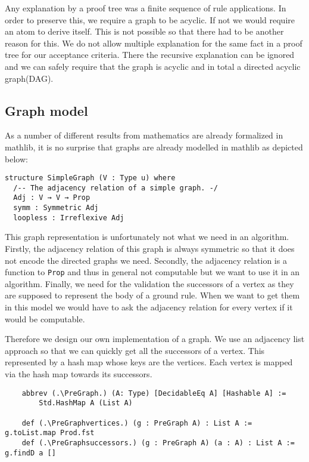 Any explanation by a proof tree was a finite sequence of rule applications. In order to preserve this, we require a graph to be acyclic. If not we would require an atom to derive itself. This is not possible so that there had to be another reason for this. We do not allow multiple explanation for the same fact in a proof tree for our acceptance criteria. There the recursive explanation can be ignored and we can safely require that the graph is acyclic and in total a directed acyclic graph(DAG).

\subsection{Graph model}

As a number of different results from mathematics are already formalized in mathlib, it is no surprise that graphs are already modelled in mathlib as depicted below:

\begin{lstlisting}
structure SimpleGraph (V : Type u) where
  /-- The adjacency relation of a simple graph. -/
  Adj : V → V → Prop
  symm : Symmetric Adj 
  loopless : Irreflexive Adj
\end{lstlisting}

This graph representation is unfortunately not what we need in an algorithm. Firstly, the adjacency relation of this graph is always symmetric so that it does not encode the directed graphs we need. Secondly, the adjacency relation is a function to \lstinline|Prop| and thus in general not computable but we want to use it in an algorithm. Finally, we need for the validation the successors of a vertex as they are supposed to represent the body of a ground rule. When we want to get them in this model we would have to ask the adjacency relation for every vertex if it would be computable.

Therefore we design our own implementation of a graph. We use an adjacency list approach so that we can quickly get all the successors of a vertex. This represented by a hash map whose keys are the vertices. Each vertex is mapped via the hash map towards its successors.

\begin{lstlisting}
    abbrev (.\PreGraph.) (A: Type) [DecidableEq A] [Hashable A] := 
        Std.HashMap A (List A)

    def (.\PreGraphvertices.) (g : PreGraph A) : List A := g.toList.map Prod.fst
    def (.\PreGraphsuccessors.) (g : PreGraph A) (a : A) : List A := g.findD a []
\end{lstlisting}

